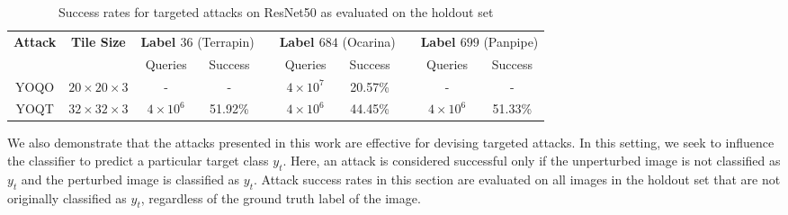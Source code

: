 \documentclass[letterpaper]{article}
\begin{document}
	\begin{table*}[t]
		\centering
		\begin{tabular}{@{}cccccccccc@{}}
			\toprule
			\multirow{2}{*}{\textbf{Attack}} & \multirow{2}{*}{\textbf{Tile Size}} &
			\multicolumn{2}{c}{\textbf{Label $36$}  (Terrapin)} & \phantom{x} &
			\multicolumn{2}{c}{\textbf{Label $684$} (Ocarina)} & \phantom{x} &
			\multicolumn{2}{c}{\textbf{Label $699$} (Panpipe)} \\ 
			\cmidrule{3-4} \cmidrule{6-7} \cmidrule{9-10} && Queries & Success && Queries & Success && Queries & Success \\
			\midrule
			YOQO  & $20 \times 20 \times 3$ &- & -& & $4\times10^7$ & 20.57\%  & & - & -\\
			YOQT & $32 \times 32 \times 3$ & $4\times10^6$ & 51.92\%&& $4\times10^6$ & 44.45\% && $4\times10^6$ & 51.33\% \\
			\bottomrule
		\end{tabular}
		\caption{Success rates for targeted attacks on ResNet50 as evaluated on the holdout set}
		\label{tab:targeted}
	\end{table*}
	
	We also demonstrate that the attacks presented in this work are effective for devising targeted attacks. In this setting, we seek to influence the classifier to predict a particular target class $y_t$. Here, an attack is considered successful only if the unperturbed image is not classified as $y_t$ and the perturbed image is classified as $y_t$. Attack success rates in this section are evaluated on all images in the holdout set that are not originally classified as $y_t$, regardless of the ground truth label of the image.
	
	
\end{document}
